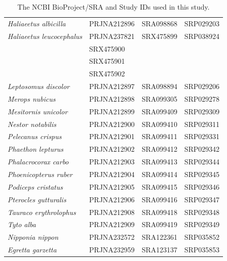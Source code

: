 \documentclass[10pt]{bmc_article}
\newenvironment{bmcformat}{\begin{raggedright}\baselineskip20pt\sloppy\setboolean{publ}{false}}{\end{raggedright}\baselineskip20pt\sloppy}
\begin{document}
\begin{bmcformat}
\begin{table}[h!]
\begin{center}
\begin{tabular}{|l|l|l|l|}
\emph{Haliaeetus albicilla} & PRJNA212896 & SRA098868 & SRP029203\\
\emph{Haliaeetus leucocephalus} & PRJNA237821 & SRX475899 & SRP038924\\
                         & SRX475900   &           &          \\
                         & SRX475901   &           &          \\
                         & SRX475902   &           &          \\
\emph{Leptosomus discolor} & PRJNA212897 & SRA098894 & SRP029206\\
\emph{Merops nubicus} & PRJNA212898 & SRA099305 & SRP029278\\
\emph{Mesitornis unicolor} & PRJNA212899 & SRA099409 & SRP029309\\
\emph{Nestor notabilis} & PRJNA212900 & SRA099410 & SRP029311\\
\emph{Pelecanus crispus} & PRJNA212901 & SRA099411 & SRP029331\\
\emph{Phaethon lepturus} & PRJNA212902 & SRA099412 & SRP029342\\
\emph{Phalacrocorax carbo} & PRJNA212903 & SRA099413 & SRP029344\\
\emph{Phoenicopterus ruber} & PRJNA212904 & SRA099414 & SRP029345\\
\emph{Podiceps cristatus} & PRJNA212905 & SRA099415 & SRP029346\\
\emph{Pterocles gutturalis} & PRJNA212906 & SRA099416 & SRP029347\\
\emph{Tauraco erythrolophus} & PRJNA212908 & SRA099418 & SRP029348\\
\emph{Tyto alba} & PRJNA212909 & SRA099419 & SRP029349\\
\emph{Nipponia nippon} & PRJNA232572 & SRA122361 & SRP035852\\
\emph{Egretta garzetta} & PRJNA232959 & SRA123137 & SRP035853\\
\hline
    \end{tabular}
  \end{center}
  \caption{The NCBI BioProject/SRA and Study IDs used in this study. }
\end{table}




\end{bmcformat}
\end{document}
